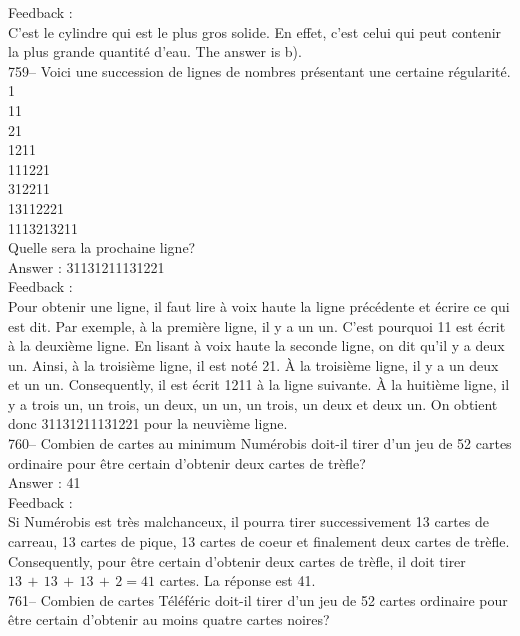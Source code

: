 ﻿\documentclass[letterpaper, 12pt]{article}
\begin{document}
Feedback : \\
C'est le cylindre qui est le plus gros solide. En effet, c'est celui qui
peut contenir la plus grande quantit\'e d'eau.  The answer is b).\\

759-- Voici une succession de lignes de nombres pr\'esentant une certaine
r\'egularit\'e.  \\
1\\
11\\
21\\
1211\\
111221\\
312211\\
13112221\\
1113213211\\

Quelle sera la prochaine ligne?\\

Answer : 31131211131221\\

Feedback : \\
Pour obtenir une ligne, il faut lire \`a voix haute la ligne pr\'ec\'edente
et \'ecrire ce qui est dit.  Par exemple, \`a la premi\`ere ligne, il y a un
un.  C'est pourquoi 11 est \'ecrit \`a la deuxi\`eme ligne. En lisant \`a
voix haute la seconde ligne, on dit qu'il y a deux un.  Ainsi, \`a la
troisi\`eme ligne, il est not\'e 21.  \`A la troisi\`eme ligne, il y a un
deux et un un.  Consequently, il est \'ecrit 1211 \`a la ligne suivante.
  \`A la huiti\`eme ligne, il y a trois un, un trois, un deux, un un, un
trois, un deux et deux un. On obtient donc 31131211131221 pour la neuvi\`eme
ligne.\\


760--  Combien de cartes au minimum Num\'erobis doit-il tirer d'un jeu de 52
cartes ordinaire pour \^etre certain d'obtenir deux cartes de tr\`efle?\\

Answer : 41\\

Feedback : \\
Si Num\'erobis est tr\`es malchanceux, il pourra tirer successivement 13
cartes de carreau, 13 cartes de pique, 13 cartes de coeur et finalement deux
cartes de tr\`efle.  Consequently, pour \^etre certain d'obtenir deux
cartes de tr\`efle, il doit tirer $13\,+\,13\,+\,13\,+\,2=41$ cartes.  La
r\'eponse est 41.\\

761-- Combien de cartes T\'el\'ef\'eric doit-il tirer d'un jeu de 52 cartes
ordinaire pour \^etre certain d'obtenir au moins quatre cartes noires?\\
\end{document}
